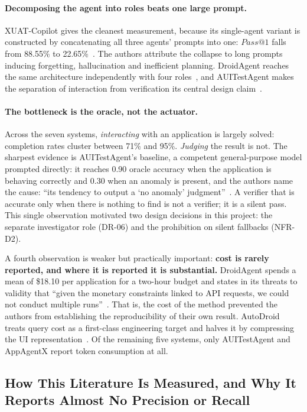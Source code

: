 \paragraph{Decomposing the agent into roles beats one large prompt.} XUAT-Copilot
gives the cleanest measurement, because its single-agent variant is constructed
by concatenating all three agents' prompts into one: $Pass@1$ falls from
88.55\% to 22.65\%~\cite{xuatcopilot}. The authors attribute the collapse to
long prompts inducing forgetting, hallucination and inefficient planning.
DroidAgent reaches the same architecture independently with four
roles~\cite{droidagent}, and AUITestAgent makes the separation of interaction
from verification its central design claim~\cite{auitestagent}.

\paragraph{The bottleneck is the oracle, not the actuator.} Across the seven
systems, \emph{interacting} with an application is largely solved: completion
rates cluster between 71\% and 95\%. \emph{Judging} the result is not. The
sharpest evidence is AUITestAgent's baseline, a competent general-purpose model
prompted directly: it reaches 0.90 oracle accuracy when the application is
behaving correctly and 0.30 when an anomaly is present, and the authors name
the cause: ``its tendency to output a `no anomaly'
judgment''~\cite{auitestagent}. A verifier that is accurate only when there is
nothing to find is not a verifier; it is a silent pass. This single observation
motivated two design decisions in this project: the separate investigator role
(DR-06) and the prohibition on silent fallbacks (NFR-D2).

A fourth observation is weaker but practically important: \textbf{cost is
rarely reported, and where it is reported it is substantial.} DroidAgent spends
a mean of \$18.10 per application for a two-hour budget and states in its
threats to validity that ``given the monetary constraints linked to API
requests, we could not conduct multiple runs''~\cite{droidagent}. That is, the
cost of the method prevented the authors from establishing the reproducibility
of their own result. AutoDroid treats query cost as a first-class engineering
target and halves it by compressing the UI representation~\cite{autodroid}. Of
the remaining five systems, only AUITestAgent and AppAgentX report token
consumption at all.

\subsection{How This Literature Is Measured, and Why It Reports Almost No Precision or Recall}
\label{subsec:measurement}

